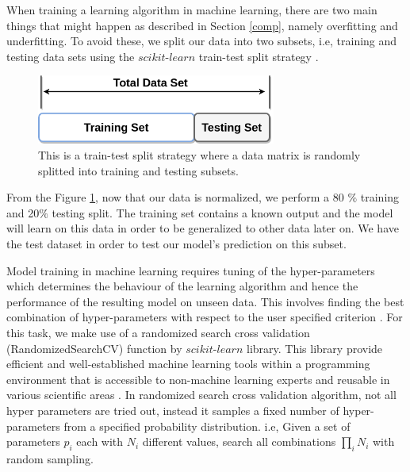 When training a learning algorithm  in machine learning, there are two main things that might happen as described in Section \ref{comp}, namely overfitting and underfitting. To avoid these, we split our data into two subsets, i.e, training and testing data sets using the $\textit{scikit-learn}$ train-test split strategy \citep{buitinck2013api}. 

  \begin{figure}[H]
  \centering
    \includegraphics[width=0.7\textwidth]{images/t_s.png}
    \caption{This is a train-test split strategy where a data matrix is randomly splitted into training and testing  subsets.}
  \label{ts}
\end{figure}

From the Figure \ref{ts}, now that our data is normalized, we perform a 80 $\%$ training and 20$\%$ testing split. The training set contains a known output and the model will learn on this data in order to be generalized to other data later on. We have the test dataset in order to test our model's prediction on this subset.
 
Model training in machine learning requires tuning of the  hyper-parameters which determines the behaviour of the learning algorithm and hence the performance
of the resulting model on unseen data. This involves finding the best combination of hyper-parameters with respect to the user specified criterion \citep{buitinck2013api}. For this task, we make use of a randomized search cross validation (RandomizedSearchCV) function by $\textit{scikit-learn}$ library. This library provide efficient and well-established machine learning tools within
a programming environment that is accessible to non-machine learning experts and reusable in various scientific areas \citep{buitinck2013api}. In randomized search cross validation algorithm, not all hyper parameters are tried out, instead it samples a fixed number of hyper-parameters from a specified probability distribution. i.e, Given a set of parameters $p_i$ each with $N_i$ different values, search all combinations $\prod_i N_i$ with random sampling.


